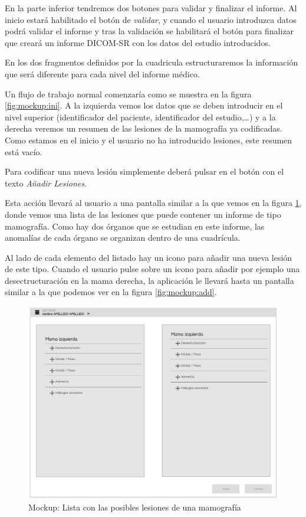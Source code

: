 En la parte inferior tendremos dos botones para validar y finalizar el informe. Al inicio estará habilitado el botón de \emph{validar}, y cuando el usuario introduzca datos podrá validar el informe y tras la validación se habilitará el botón para finalizar que creará un informe DICOM-SR con los datos del estudio introducidos.\par
En los dos fragmentos definidos por la cuadricula estructuraremos la información que será diferente para cada nivel del informe médico.\medskip\par
Un flujo de trabajo normal comenzaría como se muestra en la figura \ref{fig:mockup:ini}. A la izquierda vemos los datos que se deben introducir en el nivel superior (identificador del paciente, identificador del estudio,\ldots) y a la derecha veremos un resumen de las lesiones de la mamografía ya codificadas. Como estamos en el inicio y el usuario no ha introducido lesiones, este resumen está vacío.\par
Para codificar una nueva lesión simplemente deberá pulsar en el botón con el texto \emph{Añadir Lesiones}.\medskip\par

Esta acción llevará al usuario a una pantalla similar a la que vemos en la figura \ref{fig:mockup:tree}, donde vemos una lista de las lesiones que puede contener un informe de tipo mamografía. Como hay dos órganos que se estudian en este informe, las anomalías de cada órgano se organizan dentro de una cuadrícula.\par
Al lado de cada elemento del listado hay un icono para añadir una nueva lesión de este tipo. Cuando el usuario pulse sobre un icono para añadir por ejemplo una desectructuración en la mama derecha, la aplicación le llevará hasta un pantalla similar a la que podemos ver en la figura \ref{fig:mockup:add}.\medskip \par

\begin{figure}[ht]
\centering
\includegraphics[page=1,scale=0.4]{./imgs/mockup/mockup.pdf}
\caption{Mockup: Lista con las posibles lesiones de una mamografía}
\label{fig:mockup:tree}
\end{figure}

